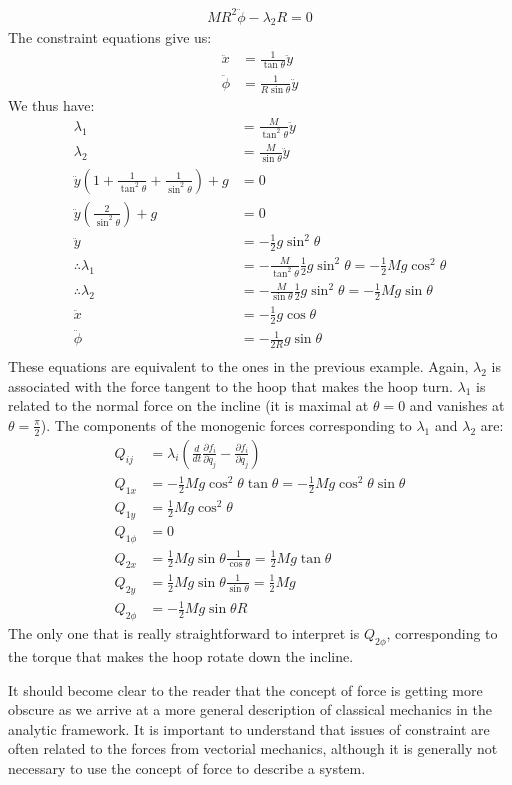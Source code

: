 \begin{example}{0pt}
\begin{align*}
MR^2\ddot{\phi}-\lambda_2 R=0
\end{align*}
The constraint equations give us:
\begin{align*}
\ddot{x}&=\frac{1}{\tan{\theta}}\ddot{y}\\
\ddot{\phi}&=\frac{1}{R\sin{\theta}}\ddot{y}
\end{align*}
We thus have:
\begin{align*}
\lambda_1&=\frac{M}{\tan^2{\theta}}\ddot{y}\\
\lambda_2&=\frac{M}{\sin{\theta}}\ddot{y}\\
\ddot{y}\left(1+\frac{1}{\tan^2{\theta}}+\frac{1}{\sin^2{\theta}}\right)+g&=0\\
\ddot{y}\left(\frac{2}{\sin^2{\theta}}\right)+g&=0\\
\ddot{y}&=-\frac{1}{2}g\sin^2{\theta}\\
\therefore \lambda_1&=-\frac{M}{\tan^2{\theta}}\frac{1}{2}g\sin^2{\theta}=-\frac{1}{2}Mg\cos^2{\theta}\\
\therefore \lambda_2&=-\frac{M}{\sin{\theta}}\frac{1}{2}g\sin^2{\theta}=-\frac{1}{2}Mg\sin{\theta}\\
\ddot{x}&=-\frac{1}{2}g\cos{\theta}\\
\ddot{\phi}&=-\frac{1}{2R}g\sin{\theta}\\
\end{align*}
These equations are equivalent to the ones in the previous example. Again, $\lambda_2$ is associated with the force tangent to the hoop that makes the hoop turn. $\lambda_1$ is related to the normal force on the incline (it is maximal at $\theta=0$ and vanishes at $\theta=\frac{\pi}{2}$). The components of the monogenic forces corresponding to $\lambda_1$ and $\lambda_2$ are:
\begin{align*}
Q_{ij}&=\lambda_i\left(\frac{d}{dt}\frac{\partial f_i}{\partial \dot{q}_j}-\frac{\partial f_i}{\partial q_j}\right)\\
Q_{1x}&=-\frac{1}{2}Mg\cos^2{\theta}\tan{\theta}=-\frac{1}{2}Mg\cos^2{\theta}\sin{\theta}\\
Q_{1y}&=\frac{1}{2}Mg\cos^2{\theta}\\
Q_{1\phi}&=0\\
Q_{2x}&=\frac{1}{2}Mg\sin{\theta}\frac{1}{\cos{\theta}}=\frac{1}{2}Mg\tan{\theta}\\
Q_{2y}&=\frac{1}{2}Mg\sin{\theta}\frac{1}{\sin{\theta}}=\frac{1}{2}Mg\\
Q_{2\phi}&=-\frac{1}{2}Mg\sin{\theta}R
\end{align*}
The only one that is really straightforward to interpret is $Q_{2\phi}$, corresponding to the torque that makes the hoop rotate down the incline.
\end{example}
It should become clear to the reader that the concept of force is getting more obscure as we arrive at a more general description of classical mechanics in the analytic framework. It is important to understand that issues of constraint are often related to the forces from vectorial mechanics, although it is generally not necessary to use the concept of force to describe a system.

